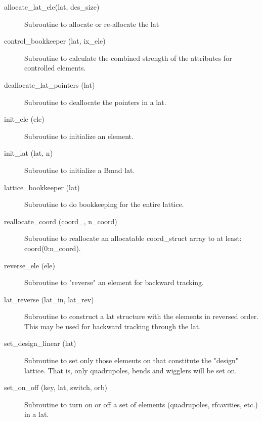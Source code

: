\begin{description}

\item[allocate_lat_ele(lat, des_size)] \Newline 
Subroutine to allocate or re-allocate the lat%

\item[control_bookkeeper (lat, ix_ele)] \Newline
Subroutine to calculate the combined strength of the attributes for
controlled elements.

\item[deallocate_lat_pointers (lat)] \Newline 
Subroutine to deallocate the pointers in a lat.

\item[init_ele (ele)] \Newline
Subroutine to initialize an element. 

\item[init_lat (lat, n)] \Newline 
Subroutine to initialize a Bmad lat.

\item[lattice_bookkeeper (lat)] \Newline 
Subroutine to do bookkeeping for the entire lattice.

\item[reallocate_coord (coord_, n_coord)] \Newline 
Subroutine to reallocate an allocatable  coord_struct array to at least:
coord(0:n_coord).

\item[reverse_ele (ele)] \Newline
Subroutine to "reverse" an element for backward tracking. 

\item[lat_reverse (lat_in, lat_rev)] \Newline
Subroutine to construct a lat structure with the elements in reversed 
order. This may be used for backward tracking through the lat. 

\item[set_design_linear (lat)] \Newline
Subroutine to set only those elements on that constitute the "design" 
lattice. That is, only quadrupoles, bends and wigglers will be set on. 

\item[set_on_off (key, lat, switch, orb)] \Newline
Subroutine to turn on or off a set of elements (quadrupoles,
rfcavities, etc.) in a lat.


\end{description}
